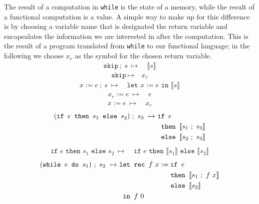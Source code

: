 \documentclass[11pt, leqno, titlepage]{article}
\theoremstyle{definition}
\begin{document}
The result of a computation in \texttt{while} is the state of a memory, while the
result of a functional computation is a value. A simple way to make up for this
difference is by choosing a variable name that is designated the return variable and
encapsulates the information we are interested in after the computation. This is the
result of a program translated from \texttt{while} to our functional language; in the
following we choose $x_r$ as the symbol for the chosen return variable. 
\begin{align}
  \texttt{skip}~;~s ~\mapsto~ & \llbracket s \rrbracket
\end{align}
\begin{align}
  \texttt{skip}     ~\mapsto~ & x_r
\end{align}
\begin{align}
  x := e~;~s        ~\mapsto~ & \texttt{let } x := e \texttt{ in }\llbracket s \rrbracket
\end{align}
\begin{align}
  x_r := e          ~\mapsto~ & e 
\end{align}
\begin{align}
  x := e            ~\mapsto~ & x_r
\end{align}
\begin{align}
  (\texttt{if } e \texttt{ then } s_1 \texttt{ else } s_2) ~;~s_3
                    ~\mapsto~ & \texttt{if } e \\
                    &  \texttt{ then } \llbracket s_1 ~;~ s_3 \rrbracket\notag\\
                    & \texttt{ else } \llbracket s_2 ~;~ s_3 \rrbracket \notag
\end{align}
\begin{align}
  \texttt{if } e \texttt{ then } s_1 \texttt{ else } s_2
                    ~\mapsto~ & \texttt{if } e
                                  \texttt{ then } \llbracket s_1 \rrbracket
                                  \texttt{ else } \llbracket s_2 \rrbracket 
\end{align}
\begin{align}
  (\texttt{while } e \texttt{ do } s_1) ~;~ s_2
                    ~\mapsto~ & \texttt{let rec } f~x :=
                                  \texttt{if } e \label{eq:while1}\\
                    & \phantom{{}=11111111111} \texttt{ then } \llbracket s_1 ~;~ f~x \rrbracket \notag\\
                    &\phantom{{}=11111111111}\texttt{ else } \llbracket s_2 \rrbracket\notag\\
                    & \texttt{ in } f~0 \notag 
\end{align}
\end{document}
